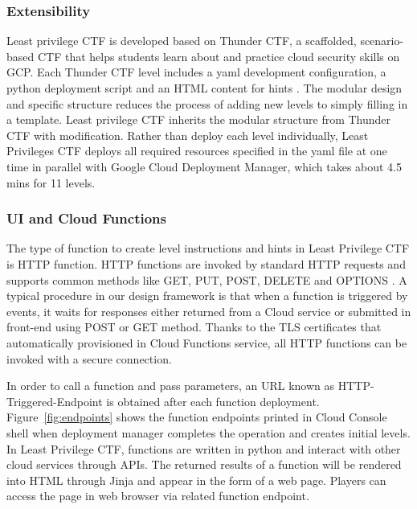 \subsubsection{Extensibility}
Least privilege CTF is developed based on Thunder CTF, a scaffolded, scenario-based CTF that helps students learn about and practice cloud security skills on GCP. Each Thunder CTF level includes a yaml development configuration, a python deployment script and an HTML content for hints \cite{Springer}. The modular design and specific structure reduces the process of adding new levels to simply filling in a template. Least privilege CTF inherits the modular structure from Thunder CTF with modification. Rather than deploy each level individually, Least Privileges CTF deploys all required resources specified in the yaml file at one time in parallel with Google Cloud Deployment Manager, which takes about 4.5 mins for 11 levels.

\subsubsection{UI and Cloud Functions}
The type of function to create level instructions and hints in Least Privilege CTF is HTTP function. HTTP functions are invoked by standard HTTP requests and supports common methods like GET, PUT, POST, DELETE and OPTIONS \cite{httpfunc}. A typical procedure in our design framework is that when a function is triggered by events, it waits for responses either returned from a Cloud service or submitted in front-end using POST or GET method. Thanks to the TLS certificates that automatically provisioned in Cloud Functions service, all HTTP functions can be invoked with a secure connection. 

In order to call a function and pass parameters, an URL known as HTTP-Triggered-Endpoint is obtained after each function deployment. Figure~\ref{fig:endpoints} shows the function endpoints printed in Cloud Console shell when deployment manager completes the operation and creates initial levels. In Least Privilege CTF, functions are written in python and interact with other cloud services through APIs. The returned results of a function will be rendered into HTML through Jinja and appear in the form of a web page. Players can access the page in web browser via related function endpoint.

